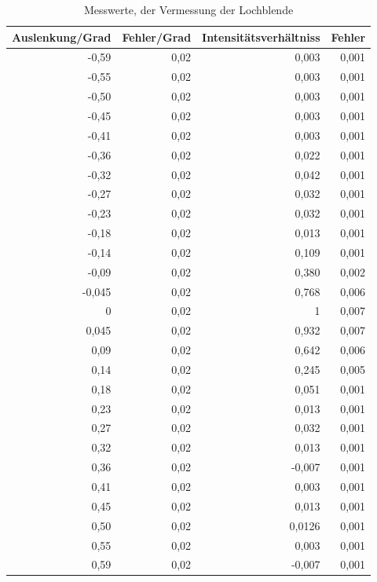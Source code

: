 \documentclass[12pt]{scrartcl}
\begin{document}
\begin{table}[htbp]
\caption{Messwerte, der Vermessung der Lochblende}
\begin{center}
\begin{tabular}{|r|r|r|r|}
\hline
\multicolumn{1}{|l|}{Auslenkung/Grad} & \multicolumn{1}{l|}{Fehler/Grad} & \multicolumn{1}{l|}{Intensitätsverhältniss} & \multicolumn{1}{l|}{Fehler} \\ \hline
-0,59 & 0,02 & 0,003 & 0,001 \\ \hline
-0,55 & 0,02 & 0,003 & 0,001 \\ \hline
-0,50 & 0,02 & 0,003 & 0,001 \\ \hline
-0,45 & 0,02 & 0,003 & 0,001 \\ \hline
-0,41 & 0,02 & 0,003 & 0,001 \\ \hline
-0,36 & 0,02 & 0,022 & 0,001 \\ \hline
-0,32 & 0,02 & 0,042 & 0,001 \\ \hline
-0,27 & 0,02 & 0,032 & 0,001 \\ \hline
-0,23 & 0,02 & 0,032 & 0,001 \\ \hline
-0,18 & 0,02 & 0,013 & 0,001 \\ \hline
-0,14 & 0,02 & 0,109 & 0,001 \\ \hline
-0,09 & 0,02 & 0,380 & 0,002 \\ \hline
-0,045 & 0,02 & 0,768 & 0,006 \\ \hline
0 & 0,02 & 1 & 0,007 \\ \hline
0,045 & 0,02 & 0,932 & 0,007 \\ \hline
0,09 & 0,02 & 0,642 & 0,006 \\ \hline
0,14 & 0,02 & 0,245 & 0,005 \\ \hline
0,18 & 0,02 & 0,051 & 0,001 \\ \hline
0,23 & 0,02 & 0,013 & 0,001 \\ \hline
0,27 & 0,02 & 0,032 & 0,001 \\ \hline
0,32 & 0,02 & 0,013 & 0,001 \\ \hline
0,36 & 0,02 & -0,007 & 0,001 \\ \hline
0,41 & 0,02 & 0,003 & 0,001 \\ \hline
0,45 & 0,02 & 0,013 & 0,001 \\ \hline
0,50 & 0,02 & 0,0126 & 0,001 \\ \hline
0,55 & 0,02 & 0,003 & 0,001 \\ \hline
0,59 & 0,02 & -0,007 & 0,001 \\ \hline
\end{tabular}
\end{center}
\label{tab:a_2_m}
\end{table}
\end{document}
